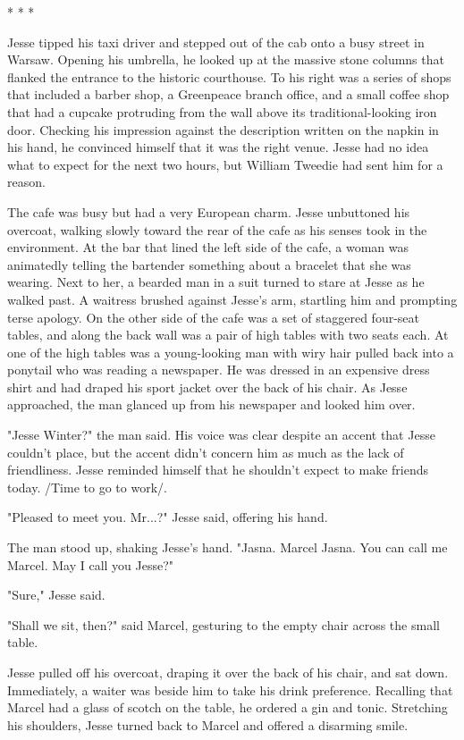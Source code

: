 									* * *
									
Jesse tipped his taxi driver and stepped out of the cab onto a busy street in Warsaw.  Opening his umbrella, he looked up at the massive stone columns that flanked the entrance to the historic courthouse.  To his right was a series of shops that included a barber shop, a Greenpeace branch office, and a small coffee shop that had a cupcake protruding from the wall above its traditional-looking iron door.  Checking his impression against the description written on the napkin in his hand, he convinced himself that it was the right venue.  Jesse had no idea what to expect for the next two hours, but William Tweedie had sent him for a reason.

The cafe was busy but had a very European charm.  Jesse unbuttoned his overcoat, walking slowly toward the rear of the cafe as his senses took in the environment.  At the bar that lined the left side of the cafe, a woman was animatedly telling the bartender something about a bracelet that she was wearing.  Next to her, a bearded man in a suit turned to stare at Jesse as he walked past.  A waitress brushed against Jesse's arm, startling him and prompting terse apology.  On the other side of the cafe was a set of staggered four-seat tables, and along the back wall was a pair of high tables with two seats each.  At one of the high tables was a young-looking man with wiry hair pulled back into a ponytail who was reading a newspaper.  He was dressed in an expensive dress shirt and had draped his sport jacket over the back of his chair.  As Jesse approached, the man glanced up from his newspaper and looked him over.

"Jesse Winter?" the man said.  His voice was clear despite an accent that Jesse couldn't place, but the accent didn't concern him as much as the lack of friendliness.  Jesse reminded himself that he shouldn't expect to make friends today.  /Time to go to work/.

"Pleased to meet you.  Mr...?" Jesse said, offering his hand.

The man stood up, shaking Jesse's hand.  "Jasna.  Marcel Jasna.  You can call me Marcel.  May I call you Jesse?"

"Sure," Jesse said.

"Shall we sit, then?" said Marcel, gesturing to the empty chair across the small table.

Jesse pulled off his overcoat, draping it over the back of his chair, and sat down.  Immediately, a waiter was beside him to take his drink preference.  Recalling that Marcel had a glass of scotch on the table, he ordered a gin and tonic.  Stretching his shoulders, Jesse turned back to Marcel and offered a disarming smile.

